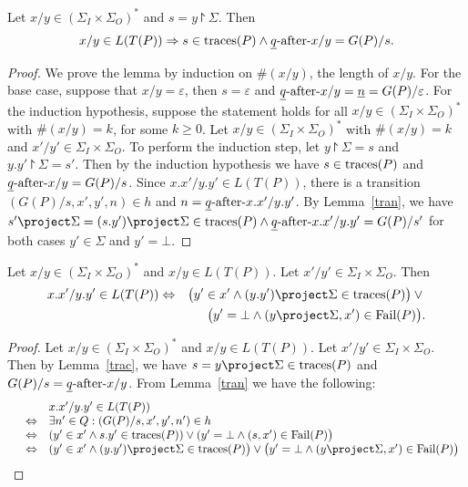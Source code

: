 \begin{lemma}\label{trac}

Let $x/y\in (\Sigma_I\times\Sigma_O)^*$ and $s=y\project \Sigma$. Then $$x/y\in L(T(P))\Rightarrow s\in\text{traces}(P) \wedge \underline q\text{-after-} x/y=G(P)/s.$$
\end{lemma}
\begin{proof}
We prove the lemma by induction on $\#(x/y)$,  the length of $x/y$. For the base case, suppose that $x/y=\varepsilon $, then $s=\varepsilon $ and $\underline q\text{-after-} x/y=\underline n=G(P)/{\varepsilon }$. For the induction hypothesis, suppose the statement holds for all $x/y\in (\Sigma_I\times\Sigma_O)^*$ with $\#(x/y)=k$, for some $k\ge 0$. Let $x/y\in (\Sigma_I\times\Sigma_O)^*$ with $\#(x/y)=k$ and 
$x'/y'\in \Sigma_I\times \Sigma_O$. To perform the induction step, let $y\project \Sigma=s$ and $y.y'\project \Sigma=s'$. Then by the induction hypothesis we have $s\in\text{traces}(P)$ and $\underline q\text{-after-} x/y=G(P)/s$.
Since $x.x'/y.y'\in L(T(P))$, there is a transition $(G(P)/s,x',y',n)\in h$ and $n=\underline q\text{-after-} x.x'/y.y'$. By Lemma~\ref{tran}, we have 
$s'\project\Sigma=(s.y')\project\Sigma\in \trc(P)\wedge \underline q\after x.x'/y.y'=G(P)/s'$ for both cases $y'\in\Sigma$ and $y'=\bot$.
\end{proof}%


\begin{lemma}\label{exte}
Let $x/y\in (\Sigma_I\times \Sigma_O)^*$ and $x/y\in L(T(P))$. Let $x'/y'\in \Sigma_I\times \Sigma_O$. Then
\begin{eqnarray*}
x.x'/y.y'\in L(T(P)) & \Leftrightarrow  &
\big(y'\in x'\wedge (y.y')\project \Sigma\in \trc(P)\big)\vee {}
\\ & & \big(y'=\bot\wedge (y\project \Sigma, x')\in {\text {\rm Fail}}(P)\big).
\end{eqnarray*}
\end{lemma}

\begin{proof}
Let $x/y\in (\Sigma_I\times \Sigma_O)^*$ and $x/y\in L(T(P))$. Let $x'/y'\in \Sigma_I\times \Sigma_O$. Then by Lemma~\ref{trac}, we have $s=y\project \Sigma\in \trc(P)$ and $G(P)/s=\underline q\text{-after-} x/y$. From Lemma~\ref{tran} we have the following:
\[\begin{array}{lll}
&&x.x'/y.y'\in L(T(P)) \\&\Leftrightarrow & \exists n'\in Q: (G(P)/s,x',y',n')\in h\\
&\Leftrightarrow & (y'\in x'\wedge s.y'\in \trc(P))\vee (y'=\bot\wedge (s, x')\in {\text {\rm Fail}}(P)\big)\\
&\Leftrightarrow & (y'\in x'\wedge (y.y')\project \Sigma\in \trc(P)\big)\vee \big(y'=\bot\wedge (y\project \Sigma, x')\in {\text {\rm Fail}}(P)\big)\end{array}
\]
\end{proof}


